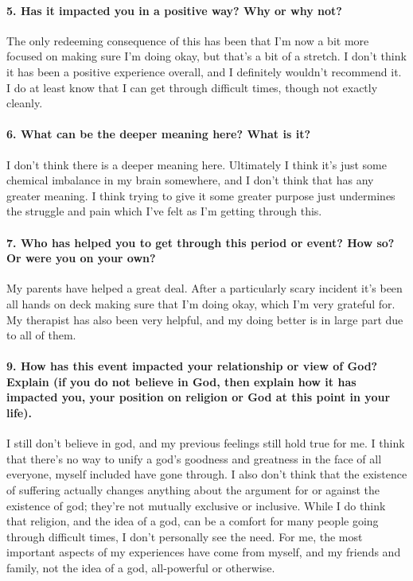 \documentclass[12pt]{article}
\begin{document}
	\paragraph{5. Has it impacted you in a positive way? Why or why not?}
	The only redeeming consequence of this has been that I'm now a bit more focused on making sure I'm doing okay, but that's a bit of a stretch. I don't think it has been a positive experience overall, and I definitely wouldn't recommend it. I do at least know that I can get through difficult times, though not exactly cleanly.

	\paragraph{6. What can be the deeper meaning here? What is it?}
	I don't think there is a deeper meaning here. Ultimately I think it's just some chemical imbalance in my brain somewhere, and I don't think that has any greater meaning. I think trying to give it some greater purpose just undermines the struggle and pain which I've felt as I'm getting through this.

	\paragraph{7. Who has helped you to get through this period or event? How so? Or were you on your own?}
	My parents have helped a great deal. After a particularly scary incident it's been all hands on deck making sure that I'm doing okay, which I'm very grateful for. My therapist has also been very helpful, and my doing better is in large part due to all of them.
	\paragraph{9. How has this event impacted your relationship or view of God? Explain (if you do not believe in God, then explain how it has impacted you, your position on religion or God at this point in your life).}
	I still don't believe in god, and my previous feelings still hold true for me. I think that there's no way to unify a god's goodness and greatness in the face of all everyone, myself included have gone through. I also don't think that the existence of suffering actually changes anything about the argument for or against the existence of god; they're not mutually exclusive or inclusive. While I do think that religion, and the idea of a god, can be a comfort for many people going through difficult times, I don't personally see the need. For me, the most important aspects of my experiences have come from myself, and my friends and family, not the idea of a god, all-powerful or otherwise.
\end{document}
